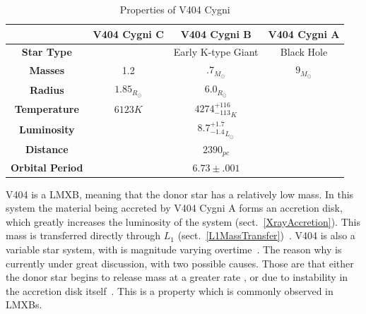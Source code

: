 \documentclass[12pt, a4paper]{article}
\begin{document}
        \begin{table} [H]
            \begin{center} 
                \begin{tabular}{||c || c | c | c ||} 
                 \hline
                 &\textbf{V404 Cygni C} & \textbf{V404 Cygni B} & \textbf{V404 Cygni A} \\ 
                 \hline\hline
                 \textbf{Star Type} & & Early K-type Giant & Black Hole \\ 
                 \hline
                 \textbf{Masses}& 1.2 \parencite{burdge_2024} \parencite{burdge_2024}& $.7_{M_\odot}$ \parencite{Bernardini_2016} & $9_{M_\odot}$ \parencite{Shahbaz_1994} \parencite{Ziółkowski_2018} \\
                 \hline
                 \textbf{Radius} & $1.85_{R_\odot}$& $6.0_{R_\odot}$ \parencite{Shahbaz_1994} &  \\
                 \hline
                 \textbf{Temperature} & $6123K$ \parencite{burdge_2024} & ${4274^{+116}_{-113}}_K$ \parencite{Ziółkowski_2018} & \\
                 \hline
                 \textbf{Luminosity} & & ${8.7^{+1.7}_{-1.4}}_{L_\odot}$ \parencite{Ziółkowski_2018} &  \\ 
                 \hline
                 \textbf{Distance} & \multicolumn{3}{c||}{$2390_{pc}$ \parencite{Bernardini_2016}} \\
                 \hline
                 \textbf{Orbital Period} & \multicolumn{3}{c||}{$6.73 \pm .001$ \parencite{Ziółkowski_2018}}\\
                 \hline  
            \end{tabular}
            \caption{Properties of V404 Cygni} 
            \label{V404Data} 
            \end{center}
        \end{table}

        V404 is a LMXB, meaning that the donor star has a relatively low mass. In this system the material being accreted by V404 Cygni A forms an accretion disk, which greatly increases the luminosity of the system (sect.~\ref{XrayAccretion}). This mass is transferred directly through $L_1$ (sect.~\ref{L1MassTransfer})~\parencite{Bartolomeo_2023}. V404 is also a variable star system, with is magnitude varying overtime~\parencite{Bernardini_2016}. The reason why is currently under great discussion, with two possible causes. Those are that either the donor star begins to release mass at a greater rate \parencite{TanakaLewin_1995}, or due to instability in the accretion disk itself~\parencite{Lasota_2001}. This is a property which is commonly observed in LMXBs. 
\end{document}
